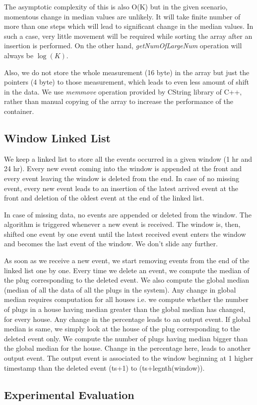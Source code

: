 The asymptotic complexity of this is also O(K) but in the given scenario, momentous change in median values are unlikely. It will take finite number of more than one steps which will lead to significant change in the median values. In such a case, very little movement will be required while sorting the array after an insertion is performed. On the other hand, \textit{getNumOfLargeNum} operation will always be $\log(K)$.

Also, we do not store the whole measurement (16 byte) in the array but just the pointers (4 byte) to those measurement, which leads to even less amount of shift in the data. We use \textit{memmove} operation provided by CString library of C++, rather than manual copying of the array to increase the performance of the container.

\subsection{Window Linked List}
We keep a linked list to store all the events occurred in a given window (1 hr and 24 hr). Every new event coming into the window is appended at the front and every event leaving the window is deleted from the end. In case of no missing event, every new event leads to an insertion of the latest arrived event at the front and deletion of the oldest event at the end of the linked list.


 In case of missing data, no events are appended or deleted from the window. The algorithm is triggered whenever a new event is received. The window is, then, shifted one event by one event until the latest received event enters the window and becomes the last event of the window. We don't slide any further.

As soon as we receive a new event, we start removing events from the end of the linked list one by one. Every time we delete an event, we compute the median of the plug corresponding to the deleted event. We also compute the global median (median of all the data of all the plugs in the system). Any change in global median requires computation for all houses i.e. we compute whether the number of plugs in a house having median greater than the global median has changed, for every house. Any change in the percentage leads to an output event. If global median is same, we simply look at the house of the plug corresponding to the deleted event only. We compute the number of plugs having median bigger than the global median for the house. Change in the percentage here, leads to another output event. The output event is associated to the window beginning at 1 higher timestamp than the deleted event (ts+1) to (ts+legnth(window)).

\subsection{Experimental Evaluation}
